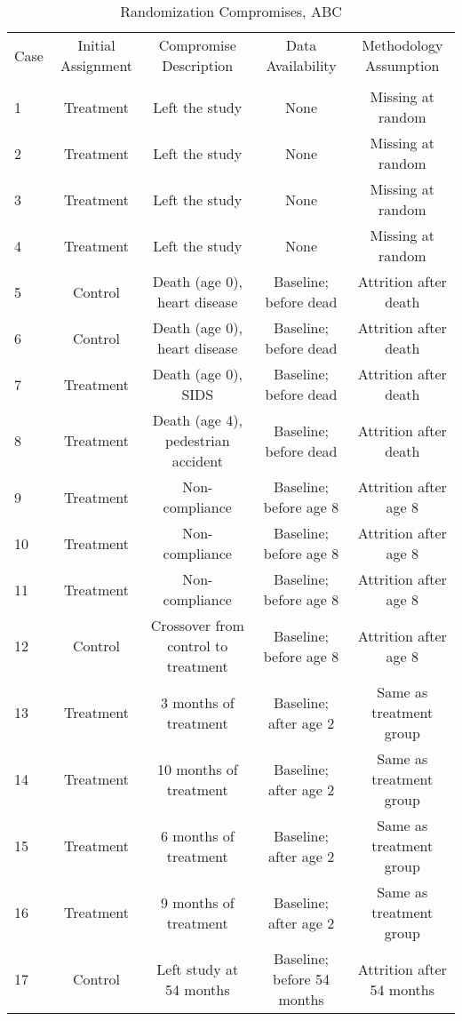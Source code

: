 \begin{sidewaystable}[H] 
\begin{threeparttable}
\caption{Randomization Compromises, ABC}
\label{table:abccompromises}
\centering
\footnotesize
\begin{tabular}{lcccc} \toprule
Case & Initial Assignment & Compromise Description & Data Availability & Methodology Assumption \\ \\ \midrule
1& Treatment & Left the study & None & Missing at random \\
2& Treatment & Left the study & None & Missing at random \\
3& Treatment & Left the study & None & Missing at random \\
4& Treatment & Left the study & None & Missing at random \\ \midrule
5& Control  & Death (age 0), heart disease & Baseline; before dead & Attrition after death \\
6&Control  & Death (age 0), heart disease & Baseline; before dead & Attrition after death \\
7&Treatment & Death (age 0), SIDS & Baseline; before dead & Attrition after death \\
8&Treatment  & Death (age 4), pedestrian accident & Baseline; before dead & Attrition after death \\ \midrule
9&Treatment  & Non-compliance  & Baseline; before age 8 & Attrition after age 8  \\
10&Treatment  & Non-compliance  & Baseline; before age 8 & Attrition after age 8  \\
11&Treatment  & Non-compliance  & Baseline; before age 8 & Attrition after age 8  \\ \midrule
12&Control        & Crossover from control to treatment & Baseline; before age 8 & Attrition after age 8  \\ \midrule
13&Treatment   & 3 months of treatment &  Baseline; after age 2 & Same as treatment group  \\  
14&Treatment &10 months of treatment &  Baseline; after age 2 & Same as treatment group  \\
15&Treatment & 6 months of treatment &  Baseline; after age 2 & Same as treatment group  \\ 
16&Treatment & 9 months of treatment &  Baseline; after age 2 & Same as treatment group  \\  \midrule
17&Control  & Left study at 54 months & Baseline; before 54 months & Attrition after 54 months \\ \midrule

\end{tabular}
\end{threeparttable}
\end{sidewaystable}

